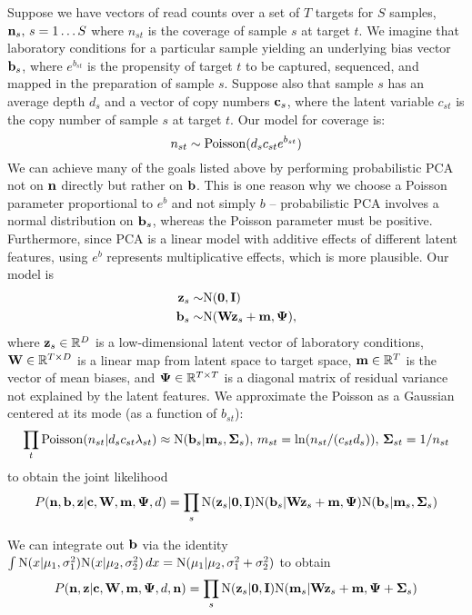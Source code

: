 \documentclass[nofootinbib,amssymb,amsmath]{revtex4}
\newcommand{\vzero}{{\bf 0}}
\newcommand{\vI}{{\bf I}}
\newcommand{\vb}{{\bf b}}
\newcommand{\vc}{{\bf c}}
\newcommand{\vz}{{\bf z}}
\newcommand{\vn}{{\bf n}}
\newcommand{\vm}{{\bf m}}
\newcommand{\vW}{{\bf W}}
\newcommand{\vPsi}{{\bf \Psi}}
\newcommand{\vSigma}{{\bf \Sigma}}
\begin{document}
Suppose we have vectors of read counts over a set of $T$ targets for $S$ samples, $\vn_s, \, s = 1 \ldots S$ where $n_{st}$ is the coverage of sample $s$ at target $t$.  We imagine that laboratory conditions for a particular sample yielding an underlying bias vector $\vb_s$, where $e^{b_{st}}$ is the propensity of target $t$ to be captured, sequenced, and mapped in the preparation of sample $s$.  Suppose also that sample $s$ has an average depth $d_s$ and a vector of copy numbers $\vc_s$, where the latent variable $c_{st}$ is the copy number of sample $s$ at target $t$.  Our model for coverage is:
%
\begin{equation}
n_{st} \sim {\rm Poisson}(d_s c_{st} e^{b_{st}})
\end{equation}
%
We can achieve many of the goals listed above by performing probabilistic PCA not on $\vn$ directly but rather on $\vb$.  This is one reason why we choose a Poisson parameter proportional to $e^b$ and not simply $b$ -- probabilistic PCA involves a normal distribution on $\vb_s$, whereas the Poisson parameter must be positive.  Furthermore, since PCA is a linear model with additive effects of different latent features, using $e^b$ represents multiplicative effects, which is more plausible.  Our model is
%
\begin{align}
\vz_s \sim& {\rm N}(\vzero, \vI) \\
\vb_s \sim& {\rm N}(\vW \vz_s + \vm, \vPsi),
\end{align}
%
where $\vz_s \in \mathbb{R}^D$ is a low-dimensional latent vector of laboratory conditions, $\vW \in \mathbb{R}^{T \times D}$ is a linear map from latent space to target space, $\vm \in \mathbb{R}^T$ is the vector of mean biases, and $\vPsi \in \mathbb{R}^{T \times T}$ is a diagonal matrix of residual variance not explained by the latent features.  We approximate the Poisson as a Gaussian centered at its mode (as a function of $b_{st}$):
%
\begin{align}
\prod_t {\rm Poisson}(n_{st} | d_s c_{st} \lambda_{st}) \approx {\rm N}(\vb_s | \vm_s, \vSigma_s), \, m_{st} = \ln(n_{st}/(c_{st} d_s)), \, \vSigma_{st} = 1/n_{st}
\end{align}
%
to obtain the joint likelihood
%
\begin{equation}
P(\vn, \vb, \vz | \vc, \vW, \vm, \vPsi, d ) = \prod_s {\rm N}(\vz_s | \vzero, \vI) {\rm N}(\vb_s | \vW \vz_s + \vm, \vPsi) {\rm N}(\vb_s | \vm_s, \vSigma_s)
\end{equation}
%

We can integrate out $\vb$ via the identity $\int {\rm N}(x | \mu_1, \sigma_1^2) {\rm N}(x | \mu_2, \sigma_2^2) \, dx = {\rm N}(\mu_1 | \mu_2, \sigma_1^2 + \sigma_2^2)$ to obtain
%
\begin{equation}
P(\vn, \vz | \vc, \vW, \vm, \vPsi, d, \vn) = \prod_s {\rm N}(\vz_s | \vzero, \vI) {\rm N}(\vm_s | \vW \vz_s + \vm, \vPsi + \vSigma_s)
\end{equation}
%
\end{document}
